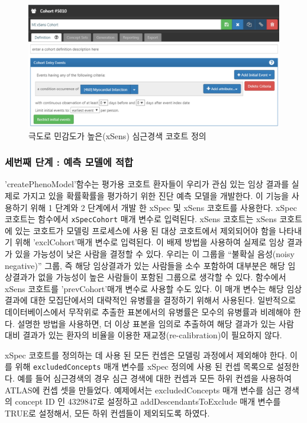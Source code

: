 \documentclass[11pt]{book}
\theoremstyle{definition}
\theoremstyle{definition}
\theoremstyle{definition}
\theoremstyle{remark}
\begin{document}
\begin{figure}

{\centering \includegraphics[width=1\linewidth]{images/ClinicalValidity/xSens} 

}

\caption{극도로 민감도가 높은(xSens) 심근경색 코호트 정의}\label{fig:xSens}
\end{figure}

\subsubsection*{세번째 단계 : 예측 모델에 적합}\label{----}

'createPhenoModel'함수는 평가용 코호트 환자들이 우리가 관심 있는 임상
결과를 실제로 가지고 있을 확률확률을 평가하기 위한 진단 예측 모델을
개발한다. 이 기능을 사용하기 위해 1 단계와 2 단계에서 개발 한 xSpec 및
xSens 코호트를 사용한다. xSpec 코호트는 함수에서 \texttt{xSpecCohort}
매개 변수로 입력된다. xSens 코호트는 xSens 코호트에 있는 코호트가 모델링
프로세스에 사용 된 대상 코호트에서 제외되어야 함을 나타내기 위해
'exclCohort'매개 변수로 입력된다. 이 배제 방법을 사용하여 실제로 임상
결과가 있을 가능성이 낮은 사람을 결정할 수 있다. 우리는 이 그룹을
``불확실 음성(noisy negative)'' 그룹, 즉 해당 임상결과가 있는 사람들을
소수 포함하여 대부분은 해당 임상결과가 없을 가능성이 높은 사람들이
포함된 그룹으로 생각할 수 있다. 함수에서 xSens 코호트를 'prevCohort'매개
변수로 사용할 수도 있다. 이 매개 변수는 해당 임상 결과에 대한
모집단에서의 대략적인 유병률을 결정하기 위해서 사용된다. 일반적으로
데이터베이스에서 무작위로 추출한 표본에서의 유병률은 모수의 유병률과
비례해야 한다. 설명한 방법을 사용하면, 더 이상 표본을 임의로 추출하여
해당 결과가 있는 사람 대비 결과가 있는 환자의 비율을 이용한
재교정(re-calibration)이 필요하지 않다.

xSpec 코호트를 정의하는 데 사용 된 모든 컨셉은 모델링 과정에서 제외해야
한다. 이를 위해 \texttt{excludedConcepts} 매개 변수를 xSpec 정의에 사용
된 컨셉 목록으로 설정한다. 예를 들어 심근경색의 경우 심근 경색에 대한
컨셉과 모든 하위 컨셉을 사용하여 ATLAS에 컨셉 셋을 만들었다. 예제에서는
excludedConcepts 매개 변수를 심근 경색의 concept ID 인 4329847로
설정하고 addDescendantsToExclude 매개 변수를 TRUE로 설정해서, 모든 하위
컨셉들이 제외되도록 하였다.
\end{document}
